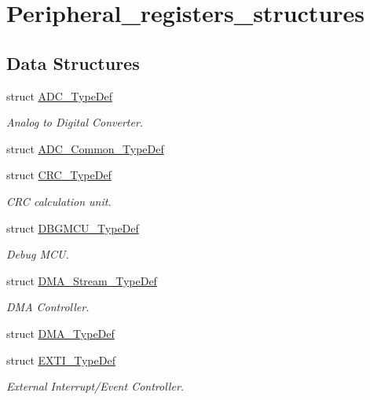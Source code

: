 \hypertarget{group___peripheral__registers__structures}{}\section{Peripheral\+\_\+registers\+\_\+structures}
\label{group___peripheral__registers__structures}
\subsection*{Data Structures}
\begin{DoxyCompactItemize}
\item 
struct \hyperlink{struct_a_d_c___type_def}{A\+D\+C\+\_\+\+Type\+Def}
\begin{DoxyCompactList}\small\item\em Analog to Digital Converter. \end{DoxyCompactList}\item 
struct \hyperlink{struct_a_d_c___common___type_def}{A\+D\+C\+\_\+\+Common\+\_\+\+Type\+Def}
\item 
struct \hyperlink{struct_c_r_c___type_def}{C\+R\+C\+\_\+\+Type\+Def}
\begin{DoxyCompactList}\small\item\em C\+RC calculation unit. \end{DoxyCompactList}\item 
struct \hyperlink{struct_d_b_g_m_c_u___type_def}{D\+B\+G\+M\+C\+U\+\_\+\+Type\+Def}
\begin{DoxyCompactList}\small\item\em Debug M\+CU. \end{DoxyCompactList}\item 
struct \hyperlink{struct_d_m_a___stream___type_def}{D\+M\+A\+\_\+\+Stream\+\_\+\+Type\+Def}
\begin{DoxyCompactList}\small\item\em D\+MA Controller. \end{DoxyCompactList}\item 
struct \hyperlink{struct_d_m_a___type_def}{D\+M\+A\+\_\+\+Type\+Def}
\item 
struct \hyperlink{struct_e_x_t_i___type_def}{E\+X\+T\+I\+\_\+\+Type\+Def}
\begin{DoxyCompactList}\small\item\em External Interrupt/\+Event Controller. \end{DoxyCompactList}\item 

\end{DoxyCompactItemize}
